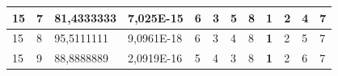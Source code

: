 \documentclass[conference]{IEEEtran}
\begin{document}
\begin{table}[]
\begin{tabular}{|llll|llllllll|}
\multicolumn{1}{|l|}{15}                                                    & \multicolumn{1}{l|}{7}                                                        & \multicolumn{1}{l|}{81,4333333}                                                   & 7,025E-15                      & \multicolumn{1}{l|}{6}                                                  & \multicolumn{1}{l|}{3}                                                  & \multicolumn{1}{l|}{5}                                                  & \multicolumn{1}{l|}{8}                                                  & \multicolumn{1}{l|}{\textbf{1}}                                         & \multicolumn{1}{l|}{2}                                                  & \multicolumn{1}{l|}{4}                                                  & 7                          \\ \hline
\multicolumn{1}{|l|}{15}                                                    & \multicolumn{1}{l|}{8}                                                        & \multicolumn{1}{l|}{95,5111111}                                                   & 9,0961E-18                     & \multicolumn{1}{l|}{6}                                                  & \multicolumn{1}{l|}{3}                                                  & \multicolumn{1}{l|}{4}                                                  & \multicolumn{1}{l|}{8}                                                  & \multicolumn{1}{l|}{\textbf{1}}                                         & \multicolumn{1}{l|}{2}                                                  & \multicolumn{1}{l|}{5}                                                  & 7                          \\ \hline
\multicolumn{1}{|l|}{15}                                                    & \multicolumn{1}{l|}{9}                                                        & \multicolumn{1}{l|}{88,8888889}                                                   & 2,0919E-16                     & \multicolumn{1}{l|}{5}                                                  & \multicolumn{1}{l|}{4}                                                  & \multicolumn{1}{l|}{3}                                                  & \multicolumn{1}{l|}{8}                                                  & \multicolumn{1}{l|}{\textbf{1}}                                         & \multicolumn{1}{l|}{2}                                                  & \multicolumn{1}{l|}{6}                                                  & 7                          \\ \hline

\end{tabular}
\end{table}
\end{document}

